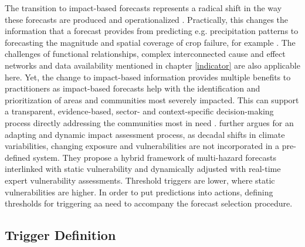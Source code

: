The transition to impact-based forecasts represents a radical shift in the way these forecasts are produced and operationalized \autocite{ifrcFbFPractitionersManual2023}. Practically, this changes the information that a forecast provides from predicting e.g. precipitation patterns to forecasting the magnitude and spatial coverage of crop failure, for example \autocite{harrowsmithFutureForecastImpact2020}. The challenges of functional relationships, complex interconnected cause and effect networks and data availability mentioned in chapter \ref{indicator} are also applicable here. Yet, the change to impact-based information provides multiple benefits to practitioners as impact-based forecasts help with the identification and prioritization of areas and communities most severely impacted. This can support a transparent, evidence-based, sector- and context-specific decision-making process directly addressing the communities most in need \autocite{ifrcFbFPractitionersManual2023}.\newline
\autocite{boultDroughtImpactbasedForecasting2022} further argues for an adapting and dynamic impact assessment process, as decadal shifts in climate variabilities, changing exposure and vulnerabilities are not incorporated in a pre-defined system. They propose a hybrid framework of multi-hazard forecasts interlinked with static vulnerability and dynamically adjusted with real-time expert vulnerability assessments. Threshold triggers are lower, where static vulnerabilities are higher. In order to put predictions into actions, defining thresholds for triggering \acrlong{aa} need to accompany the forecast selection procedure.

\subsection{Trigger Definition}\label{subsec:trigger}

